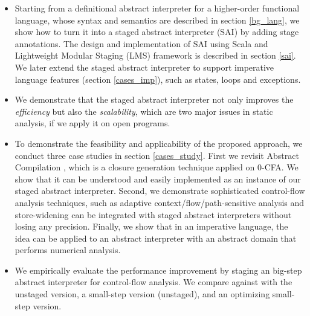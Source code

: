 \begin{itemize}
\item Starting from a definitional abstract interpreter for a higher-order functional language,
  whose syntax and semantics are described in section \ref{bg_lang},
  we show how to turn it into a staged abstract interpreter (SAI) by adding stage annotations. 
  The design and implementation of SAI using Scala and Lightweight Modular Staging (LMS) framework is 
  described in section \ref{sai}.
  We later extend the staged abstract interpreter to support imperative language features 
  (section \ref{cases_imp}), such as states, loops and exceptions.
\item We demonstrate that the staged abstract interpreter not only improves the \textit{efficiency}
  but also the \textit{scalability}, which are two major issues in static analysis, if we apply it on open
  programs. 
\item To demonstrate the feasibility and applicability of the proposed approach, we conduct three case studies in section \ref{cases_study}. 
  First we revisit Abstract Compilation \cite{Boucher:1996:ACN:647473.727587}, which is a closure generation 
  technique applied on 0-CFA. We show that it can be understood and easily implemented as an instance of 
  our staged abstract interpreter. 
  Second, we demonstrate sophisticated control-flow analysis techniques, such as adaptive context/flow/path-sensitive 
  analysis and store-widening can be integrated with staged abstract interpreters without losing any precision.
  Finally, we show that in an imperative language, the idea can be applied to an abstract interpreter with
  an abstract domain that performs numerical analysis.
\item We empirically evaluate the performance improvement by staging an big-step abstract interpreter 
  for control-flow analysis. We compare against with the unstaged version, a small-step version (unstaged), 
  and an optimizing small-step version.
\end{itemize}
